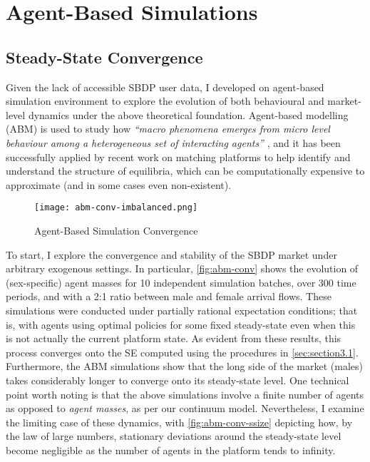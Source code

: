 \section{Agent-Based Simulations}
\label{sec:section4}  
\subsection{Steady-State Convergence}
Given the lack of accessible SBDP user data, I developed on agent-based simulation environment to explore the evolution of both behavioural and market-level dynamics under the above theoretical foundation. 
Agent-based modelling (ABM) is used to study how \textit{``macro phenomena emerges from micro level behaviour among a heterogeneous set of interacting agents''} \citep{janssen2005agent}, and it has been successfully applied by recent work on matching platforms \citep{immorlica2021designing} to help identify and understand the structure of equilibria, which can be computationally expensive to approximate (and in some cases even non-existent).

\begin{figure}[ht]
    \centering
    \caption{Agent-Based Simulation Convergence}
    \texttt{[image: abm-conv-imbalanced.png]}
    \label{fig:abm-conv} 
\end{figure}

To start, I explore the convergence and stability of the SBDP market under arbitrary exogenous settings. 
In particular, \autoref{fig:abm-conv} shows the evolution of (sex-specific) agent masses for 10 independent simulation batches, over 300 time periods, and with a 2:1 ratio between male and female arrival flows. 
These simulations were conducted under partially rational expectation conditions; that is, with agents using optimal policies for some fixed steady-state even when this is not actually the current platform state.  
As evident from these results, this process converges onto the SE computed using the procedures in \autoref{sec:section3.1}. 
Furthermore, the ABM simulations show that the long side of the market (males) takes considerably longer to converge onto its steady-state level. 
One technical point worth noting is that the above simulations involve a finite number of agents as opposed to \textit{agent masses}, as per our continuum model.  
Nevertheless, I examine the limiting case of these dynamics, with \autoref{fig:abm-conv-ssize} depicting how, by the law of large numbers, stationary deviations around the steady-state level become negligible as the number of agents in the platform tends to infinity. 

